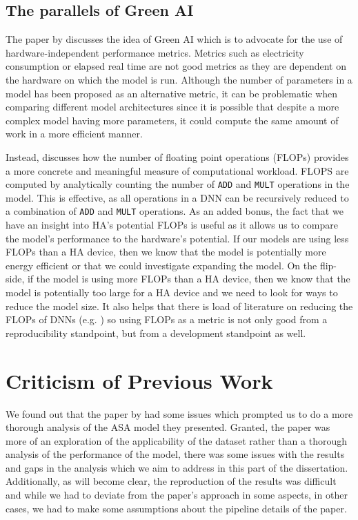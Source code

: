 \documentclass[logo,bsc,singlespacing,parskip,online]{infthesis}
\begin{document}

\subsection{The parallels of Green AI}
The paper by \citet{schwartz2019greenai} discusses the idea of Green AI 
which is to advocate for the use of hardware-independent performance metrics.
Metrics such as electricity consumption or elapsed real time are not good metrics 
as they are dependent on the hardware on which the model is run. 
Although the number of parameters in a model has been proposed as an 
alternative metric, it can be problematic when comparing different model architectures 
since it is possible that despite a more complex model having more parameters, 
it could compute the same amount of work in a more efficient manner. 

Instead, \citet{schwartz2019greenai} discusses how the number of floating point operations (FLOPs)
provides a more concrete and meaningful measure of computational workload. 
FLOPS are computed by analytically counting the number of \texttt{ADD} and \texttt{MULT} operations in the model.
This is effective, as all operations in a DNN can be recursively reduced to a combination 
of \texttt{ADD} and \texttt{MULT} operations.
As an added bonus, the fact that we have an insight into HA's potential FLOPs is useful 
as it allows us to compare the model's performance to the hardware's potential. If our 
models are using less FLOPs than a HA device, then we know that the model is 
potentially more energy efficient or that we could investigate expanding 
the model. On the flip-side, if the model is using more FLOPs than a HA device, 
then we know that the model is potentially too large for a HA device and we need 
to look for ways to reduce the model size. It also helps that there is load 
of literature on reducing the FLOPs of DNNs (e.g. \cite{liu_simple_2023}) so 
using FLOPs as a metric is not only good from a reproducibility standpoint, 
but from a development standpoint as well. 

\section{Criticism of Previous Work}
We found out that the paper by \citet{Huwel2020HearDS} had 
some issues which prompted us to do a more thorough analysis of the ASA 
model they presented. Granted, the paper was more of an exploration of the applicability of the dataset rather than a thorough analysis of the 
performance of the model, there was some issues with 
the results and gaps in the analysis which we aim to address in this part of the dissertation. 
Additionally, as will become clear, the reproduction of the results 
was difficult and while we had to deviate from the paper's approach 
in some aspects, in other cases, we had to make some assumptions 
about the pipeline details of the paper.
\end{document}
